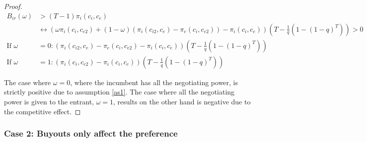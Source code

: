 \begin{proof}
\begin{align*}
B_{ir}(\omega)&>(T-1)\pi_i(c_i,c_e) \\
& \leftrightarrow (\omega \pi_i(c_i,c_{e2})+(1-\omega)(\pi_{i}(c_{i2},c_{e})-\pi_{e}(c_{i},c_{e2}))-\pi_i(c_i,c_e)) \left( T - \frac{1}{q} \left( 1-(1-q)^{T} \right) \right)>0 \\
\text{If }\omega &=0: (\pi_{i}(c_{i2},c_{e})-\pi_{e}(c_{i},c_{e2})-\pi_i(c_i,c_e)) \left( T - \frac{1}{q} \left( 1-(1-q)^{T} \right) \right) \\
\text{If }\omega &=1: ( \pi_i(c_i,c_{e2})-\pi_i(c_i,c_e)) \left( T - \frac{1}{q} \left( 1-(1-q)^{T} \right) \right)
\end{align*}

The case where $\omega = 0$, where the incumbent has all the negotiating power, is strictly positive due to assumption \ref{as1}. The case where all the negotiating power is given to the entrant, $\omega = 1$, results on the other hand is negative due to the competitive effect.  
\end{proof}

\subsubsection{Case 2: Buyouts only affect the preference} \label{case:decision}


